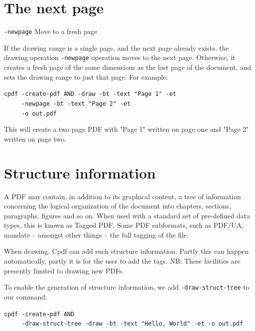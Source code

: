 \documentclass{book}
\begin{document}
\section{The next page}

  {\small\begin{framed}
   \vspace{1.5mm}
   \noindent\verb!-newpage! Move to a fresh page
  \end{framed}}

If the drawing range is a single page, and the next page already exists, the drawing operation \texttt{-newpage} operation moves to the next page. Otherwise, it creates a fresh page of the same dimensions as the last page of the document, and sets the drawing range to just that page. For example:

\begin{framed}
 \noindent\small\verb?cpdf -create-pdf AND -draw -bt -text "Page 1" -et?\\
 \noindent\small\verb?     -newpage -bt -text "Page 2" -et?\\
 \noindent\small\verb?     -o out.pdf?
\end{framed}

\noindent This will create a two page PDF with "Page 1" written on page one and "Page 2" written on page two.

\section{Structure information}

A PDF may contain, in addition to its graphical content, a tree of information concerning the logical organization of the document into chapters, sections, paragraphs, figures and so on. When used with a standard set of pre-defined data types, this is known as Tagged PDF. Some PDF subformats, such as PDF/UA, mandate -- amongst other things -- the full tagging of the file.

When drawing, Cpdf can add such structure information. Partly this can happen automatically, partly it is for the user to add the tags. NB: These facilities are presently limited to drawing new PDFs.

To enable the generation of structure information, we add \texttt{-draw-struct-tree} to our command:

\begin{framed}
   \noindent\small\verb!cpdf -create-pdf AND!\\
   \noindent\small\verb!     -draw-struct-tree -draw -bt -text "Hello, World" -et -o out.pdf!
\end{framed}
\end{document}
